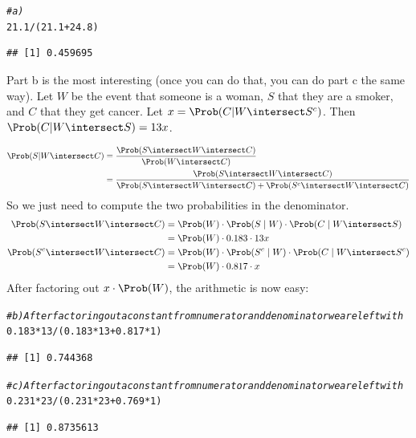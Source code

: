 \documentclass[twoside]{book}\usepackage[]{graphicx}\usepackage[]{xcolor}
\makeatletter
\newcommand{\hlnum}[1]{\textcolor[rgb]{0.686,0.059,0.569}{#1}}%
\newcommand{\hlcom}[1]{\textcolor[rgb]{0.678,0.584,0.686}{\textit{#1}}}%
\newcommand{\hlopt}[1]{\textcolor[rgb]{0,0,0}{#1}}%
\newcommand{\hlstd}[1]{\textcolor[rgb]{0.345,0.345,0.345}{#1}}%
\newenvironment{kframe}{%
 \def\at@end@of@kframe{}%
 \ifinner\ifhmode%
  \def\at@end@of@kframe{\end{minipage}}%
  \begin{minipage}{\columnwidth}%
 \fi\fi%
 \def\FrameCommand##1{\hskip\@totalleftmargin \hskip-\fboxsep
 \colorbox{shadecolor}{##1}\hskip-\fboxsep
     \hskip-\linewidth \hskip-\@totalleftmargin \hskip\columnwidth}%
 \MakeFramed {\advance\hsize-\width
   \@totalleftmargin\z@ \linewidth\hsize
   \@setminipage}}%
 {\par\unskip\endMakeFramed%
 \at@end@of@kframe}
\newenvironment{knitrout}{}{} %
\makeatother
\begin{document}
\begin{solution}
\begin{knitrout}
\color{fgcolor}\begin{kframe}
\begin{alltt}
\hlcom{# a)}
\hlnum{21.1}\hlopt{/}\hlstd{(}\hlnum{21.1} \hlopt{+} \hlnum{24.8}\hlstd{)}
\end{alltt}
\begin{verbatim}
## [1] 0.459695
\end{verbatim}
\end{kframe}
\end{knitrout}
Part b is the most interesting (once you can do that, you can do part c the same way).
Let $W$ be the event that someone is a woman, $S$ that they are a smoker, and $C$ that they
get cancer. Let $x = \Prob( C | W \intersect S^c)$.  Then $\Prob( C | W \intersect S ) = 13x$.

\begin{align*}
	\Prob( S | W \intersect C ) 
	& = \frac{ \Prob(S \intersect W \intersect C) }{\Prob(W \intersect C)}
	\\
	& = \frac{ \Prob(S \intersect W \intersect C) }
	{\Prob(S \intersect W \intersect C) + \Prob( S^c \intersect W \intersect C)}
\end{align*}
So we just need to compute the two probabilities in the denominator.
\begin{align*}
	\Prob(S \intersect W \intersect C)
	&= \Prob(W) \cdot \Prob(S \mid W) \cdot \Prob(C \mid W \intersect S) 
	\\
	&= \Prob(W) \cdot 0.183 \cdot 13x
	\\
	\Prob(S^c \intersect W \intersect C)
	&= \Prob(W) \cdot \Prob(S^c \mid W) \cdot \Prob(C \mid W \intersect S^c) 
	\\
	&= \Prob(W) \cdot 0.817 \cdot x
\end{align*}
After factoring out $x \cdot \Prob(W)$, the arithmetic is now easy:

\begin{knitrout}
\color{fgcolor}\begin{kframe}
\begin{alltt}
\hlcom{# b) After factoring out a constant from numerator and denominator we are left with}
\hlnum{0.183} \hlopt{*} \hlnum{13}\hlopt{/}\hlstd{(}\hlnum{0.183} \hlopt{*} \hlnum{13} \hlopt{+} \hlnum{0.817} \hlopt{*} \hlnum{1}\hlstd{)}
\end{alltt}
\begin{verbatim}
## [1] 0.744368
\end{verbatim}
\begin{alltt}
\hlcom{# c) After factoring out a constant from numerator and denominator we are left with}
\hlnum{0.231} \hlopt{*} \hlnum{23}\hlopt{/}\hlstd{(}\hlnum{0.231} \hlopt{*} \hlnum{23} \hlopt{+} \hlnum{0.769} \hlopt{*} \hlnum{1}\hlstd{)}
\end{alltt}
\begin{verbatim}
## [1] 0.8735613
\end{verbatim}
\end{kframe}
\end{knitrout}


\end{solution}
\end{document}
